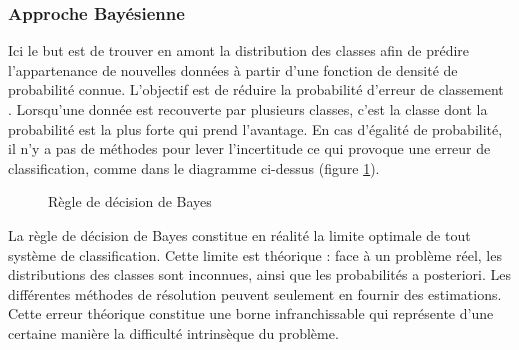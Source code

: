\documentclass[../thesis.tex]{subfiles}
\begin{document}
    
    \newpage
    \subsubsection{Approche Bayésienne} Ici le but est de trouver en amont la distribution des classes afin de prédire l'appartenance de nouvelles données à partir d'une fonction de densité de probabilité connue. L'objectif est de réduire la probabilité d'erreur de classement \cite{dunsmore1966bayesian}. Lorsqu'une donnée est recouverte par plusieurs classes, c'est la classe dont la probabilité est la plus forte qui prend l'avantage. En cas d'égalité de probabilité, il n'y a pas de méthodes pour lever l'incertitude ce qui provoque une erreur de classification, comme dans le diagramme ci-dessus (figure \ref{fig:03-classification-bayes}). %
    
    \begin{figure}[H]
        \centering
        
        \caption{Règle de décision de Bayes}
        \label{fig:03-classification-bayes}
    \end{figure}
    
    La règle de décision de Bayes constitue en réalité la limite optimale de tout système de classification. Cette limite est théorique : face à un problème réel, les distributions des classes sont inconnues, ainsi que les probabilités a posteriori. Les différentes méthodes de résolution peuvent seulement en fournir des estimations. Cette erreur théorique constitue une borne infranchissable qui représente d'une certaine manière la difficulté intrinsèque du problème.
    
\end{document}
